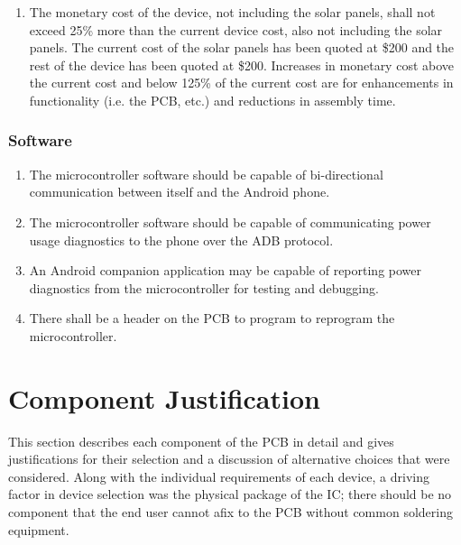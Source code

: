 \documentclass{article}
\numberwithin{figure}{section}
\numberwithin{equation}{section}
\begin{document}
{\begin{enumerate}[align=left,leftmargin=*, labelindent= 0em, label=\textbf{Requirement \thesubsubsection.\arabic*.}, itemindent=0em]
\item \label{HW4} The monetary cost of the device, not including the solar panels, shall not exceed 25\% more than the current device cost, also not including the solar panels. The current cost of the solar panels has been quoted at \$200 and the rest of the device has been quoted at \$200. Increases in monetary cost above the current cost and below 125\% of the current cost are for enhancements in functionality (i.e. the PCB, etc.) and reductions in assembly time.

\end{enumerate}
\subsubsection{Software} \label{sect:software2}
\begin{enumerate}[align=left,leftmargin=*, labelindent= 0em, label=\textbf{Requirement \thesubsubsection.\arabic*.}, itemindent=0em]
\item \label{SW1}The microcontroller software should be capable of bi-directional communication between itself and the Android phone.
\item \label{SW2}The microcontroller software should be capable of communicating power usage diagnostics to the phone over the ADB protocol.
\item \label{SW3}An Android companion application may be capable of reporting power diagnostics from the microcontroller for testing and debugging.
\item \label{SW4}There shall be a header on the PCB to program to reprogram the microcontroller.
\end{enumerate}

\section{Component Justification} \label{sect:justification}
This section describes each component of the PCB in detail and gives justifications for their selection and a discussion of alternative choices that were considered. Along with the individual requirements of each device, a driving factor in device selection was the physical package of the IC; there should be no component that the end user cannot afix to the PCB without common soldering equipment.

}
\end{document}
